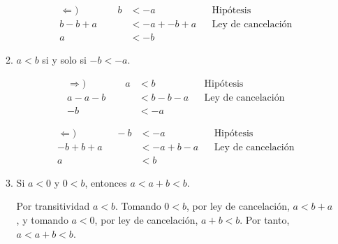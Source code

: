 \documentclass[11pt]{article}
\begin{document}
\begin{enumerate}[label=\alph*)]
\begin{enumerate}[label=\roman*)]
\begin{center}
        \begin{minipage}[r]{.5\linewidth}
            \begin{align*}
                \Leftarrow) \qquad \qquad
                b &< -a && \text{Hipótesis}\\
                b -b +a &< -a + -b +a && \text{Ley de cancelación}\\
                a &< -b%
            \end{align*}
        \end{minipage}
        \end{center}
        \item $a<b$ si y solo si $-b<-a$.
        \begin{center}\vspace{-1em}
        \begin{minipage}[l]{.5\linewidth}
            \begin{align*}
                \Rightarrow) \qquad \qquad
                a &< b && \text{Hipótesis}\\
                a -a -b &< b -b -a && \text{Ley de cancelación}\\
                -b &< -a%
            \end{align*}
        \end{minipage}%
        \begin{minipage}[r]{.5\linewidth}
            \begin{align*}
                \Leftarrow) \qquad \qquad
                -b &< -a && \text{Hipótesis}\\
                -b + b +a &< -a +b -a && \text{Ley de cancelación}\\
                a &< b &&%
            \end{align*}
        \end{minipage}
        \end{center}
        \item Si $a<0$ y $0<b$, entonces $a<a+b<b$.
        
        Por transitividad $a<b$. Tomando $0<b$, por ley de cancelación, $a<b+a$, y tomando $a<0$, por ley de cancelación, $a+b<b$. Por tanto, $a<a+b<b$.
    \end{enumerate} %

\pagebreak


\end{enumerate}
\end{document}
